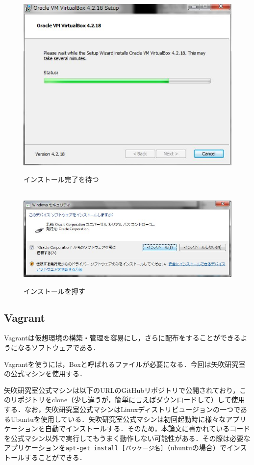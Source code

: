 \begin{figure}[htbp]
\centering　
\includegraphics[width=13cm]{VB8.png}
\caption{インストール完了を待つ}
\end{figure}

\begin{figure}[htbp]
\centering　
\includegraphics[width=13cm]{VB9.png}
\caption{インストールを押す}
\end{figure}



\subsection{Vagrant}

Vagrantは仮想環境の構築・管理を容易にし，さらに配布をすることができるようになるソフトウェアである．

Vagrantを使うには，Boxと呼ばれるファイルが必要になる．今回は矢吹研究室の公式マシンを使用する．

矢吹研究室公式マシンは以下のURLのGitHubリポジトリで公開されており，このリポジトリをclone（少し違うが，簡単に言えばダウンロードして）して使用する．なお，矢吹研究室公式マシンはLinuxディストリビュージョンの一つであるUbuntuを使用している．矢吹研究室公式マシンは初回起動時に様々なアプリケーションを自動でインストールする．そのため，本論文に書かれているコードを公式マシン以外で実行してもうまく動作しない可能性がある．その際は必要なアプリケーションを\texttt{apt-get install [パッケージ名]}（ubuntuの場合）でインストールすることができる．

